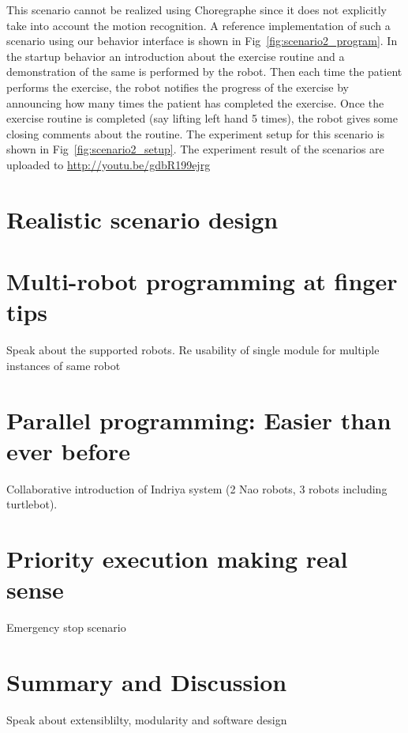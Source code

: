 This scenario cannot be realized using Choregraphe since it does not explicitly take into account the motion recognition. A reference implementation of such a scenario using our behavior interface is shown in Fig~\ref{fig:scenario2_program}. In the startup behavior an introduction about the exercise routine and a demonstration of the same is performed by the robot. Then each time the patient performs the exercise, the robot notifies the progress of the exercise by announcing how many times the patient has completed the exercise. Once the exercise routine is completed (say lifting left hand 5 times), the robot gives some closing comments about the routine. The experiment setup for this scenario is shown in Fig~\ref{fig:scenario2_setup}. The experiment result of the scenarios are uploaded to \url{http://youtu.be/gdbR199ejrg}

\section{Realistic scenario design}


\section{Multi-robot programming at finger tips}
Speak about the supported robots. Re usability of single module for multiple instances of same robot

\section{Parallel programming: Easier than ever before}
Collaborative introduction of Indriya system (2 Nao robots, 3 robots including turtlebot). 

\section{Priority execution making real sense}
Emergency stop scenario

\section{Summary and Discussion}

Speak about extensiblilty, modularity and software design